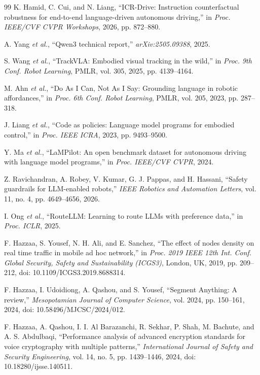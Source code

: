 \documentclass[conference]{IEEEtran}
\begin{document}
\begin{thebibliography}{99}
K. Hamid, C. Cui, and N. Liang, ``ICR-Drive: Instruction counterfactual robustness for end-to-end language-driven autonomous driving,'' in \textit{Proc. IEEE/CVF CVPR Workshops}, 2026, pp. 872--880.

A. Yang \textit{et al.}, ``Qwen3 technical report,'' \textit{arXiv:2505.09388}, 2025.

S. Wang \textit{et al.}, ``TrackVLA: Embodied visual tracking in the wild,'' in \textit{Proc. 9th Conf. Robot Learning}, PMLR, vol. 305, 2025, pp. 4139--4164.

M. Ahn \textit{et al.}, ``Do As I Can, Not As I Say: Grounding language in robotic affordances,'' in \textit{Proc. 6th Conf. Robot Learning}, PMLR, vol. 205, 2023, pp. 287--318.

J. Liang \textit{et al.}, ``Code as policies: Language model programs for embodied control,'' in \textit{Proc. IEEE ICRA}, 2023, pp. 9493--9500.

Y. Ma \textit{et al.}, ``LaMPilot: An open benchmark dataset for autonomous driving with language model programs,'' in \textit{Proc. IEEE/CVF CVPR}, 2024.

Z. Ravichandran, A. Robey, V. Kumar, G. J. Pappas, and H. Hassani, ``Safety guardrails for LLM-enabled robots,'' \textit{IEEE Robotics and Automation Letters}, vol. 11, no. 4, pp. 4649--4656, 2026.

I. Ong \textit{et al.}, ``RouteLLM: Learning to route LLMs with preference data,'' in \textit{Proc. ICLR}, 2025.

F. Hazzaa, S. Yousef, N. H. Ali, and E. Sanchez, ``The effect of nodes density on real time traffic in mobile ad hoc network,'' in \textit{Proc. 2019 IEEE 12th Int. Conf. Global Security, Safety and Sustainability (ICGS3)}, London, UK, 2019, pp. 209--212, doi: 10.1109/ICGS3.2019.8688314.

F. Hazzaa, I. Udoidiong, A. Qashou, and S. Yousef, ``Segment Anything: A review,'' \textit{Mesopotamian Journal of Computer Science}, vol. 2024, pp. 150--161, 2024, doi: 10.58496/MJCSC/2024/012.

F. Hazzaa, A. Qashou, I. I. Al Barazanchi, R. Sekhar, P. Shah, M. Bachute, and A. S. Abdulbaqi, ``Performance analysis of advanced encryption standards for voice cryptography with multiple patterns,'' \textit{International Journal of Safety and Security Engineering}, vol. 14, no. 5, pp. 1439--1446, 2024, doi: 10.18280/ijsse.140511.

\end{thebibliography}
\end{document}
